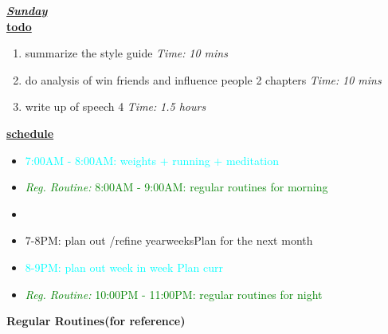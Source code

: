 \documentclass[11pt]{article}
\newcommand{\timeEst}[1]{\textit{Time:} \textit{#1}}
\newcommand{\regItem}[1]{\item \textcolor{cyan}{#1}}
\newcommand{\regRoutineItem}[1]{\item \textcolor{green}{\textit{Reg. Routine:} #1}}
\begin{document}
\underline{\textbf{\textit{Sunday}}}\\
\underline{\textbf{todo}}\\
\begin{enumerate}
\item summarize the style guide \timeEst{10 mins}
\item do analysis of win friends and influence people 2 chapters \timeEst{10 mins}
\item  write up of speech 4 \timeEst{1.5 hours}
\end{enumerate}

\underline{\textbf{schedule}}\\
\begin{itemize}
\regItem{7:00AM - 8:00AM: weights + running + meditation }
\regRoutineItem {8:00AM - 9:00AM: regular routines for morning}
\item
\item 7-8PM: plan out /refine yearweeksPlan for the next month
\regItem{8-9PM:  plan out week in week Plan curr}
\regRoutineItem{10:00PM - 11:00PM: regular routines for night}
\end{itemize}


\newpage

\textbf{Regular Routines(for reference)}

\end{document}
